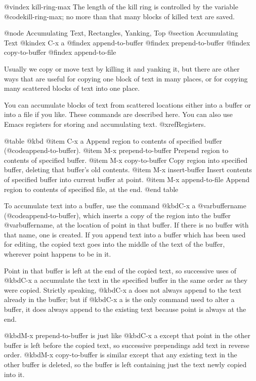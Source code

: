 {{{{{{{{@vindex kill-ring-max
  The length of the kill ring is controlled by the variable
@code{kill-ring-max}; no more than that many blocks of killed text are
saved.

@node Accumulating Text, Rectangles, Yanking, Top
@section Accumulating Text
@kindex C-x a
@findex append-to-buffer
@findex prepend-to-buffer
@findex copy-to-buffer
@findex append-to-file

  Usually we copy or move text by killing it and yanking it, but there are
other ways that are useful for copying one block of text in many places, or
for copying many scattered blocks of text into one place.

  You can accumulate blocks of text from scattered locations either into a
buffer or into a file if you like.  These commands are described here.  You
can also use Emacs registers for storing and accumulating text.
@xref{Registers}.

@table @kbd
@item C-x a
Append region to contents of specified buffer (@code{append-to-buffer}).
@item M-x prepend-to-buffer
Prepend region to contents of specified buffer.
@item M-x copy-to-buffer
Copy region into specified buffer, deleting that buffer's old contents.
@item M-x insert-buffer
Insert contents of specified buffer into current buffer at point.
@item M-x append-to-file
Append region to contents of specified file, at the end.
@end table

  To accumulate text into a buffer, use the command @kbd{C-x a @var{buffername}}
(@code{append-to-buffer}), which inserts a copy of the region into the
buffer @var{buffername}, at the location of point in that buffer.  If there
is no buffer with that name, one is created.  If you append text into a
buffer which has been used for editing, the copied text goes into the
middle of the text of the buffer, wherever point happens to be in it.

  Point in that buffer is left at the end of the copied text, so successive
uses of @kbd{C-x a} accumulate the text in the specified buffer in the same
order as they were copied.  Strictly speaking, @kbd{C-x a} does not always
append to the text already in the buffer; but if @kbd{C-x a} is the only
command used to alter a buffer, it does always append to the existing text
because point is always at the end.

  @kbd{M-x prepend-to-buffer} is just like @kbd{C-x a} except that point in
the other buffer is left before the copied text, so successive prependings
add text in reverse order.  @kbd{M-x copy-to-buffer} is similar except that
any existing text in the other buffer is deleted, so the buffer is left
containing just the text newly copied into it.

}}}}}}}}
